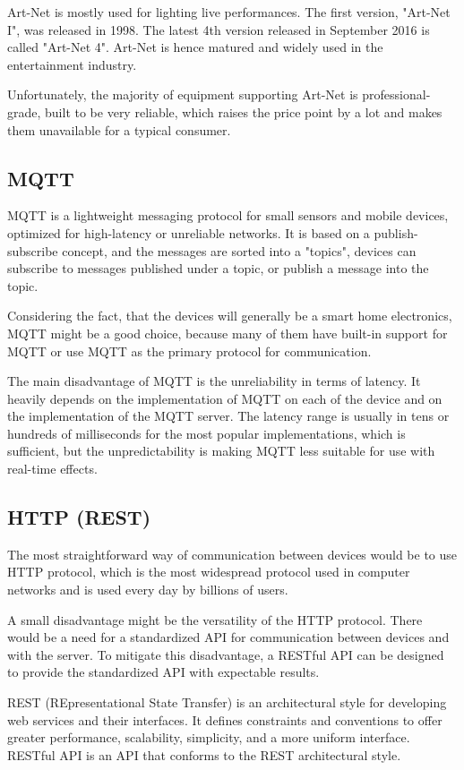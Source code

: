 Art-Net is mostly used for lighting live performances. The first version,
"Art-Net I", was released in 1998. The latest 4th version released
in September 2016
is called "Art-Net 4". Art-Net is hence matured and widely used in the
entertainment industry.


Unfortunately, the majority of equipment supporting Art-Net is
professional-grade, built to be very reliable, which raises the price point
by a lot and makes them unavailable for a typical consumer.


\hypertarget{x-mqtt}{\subsection{MQTT}}
MQTT is a lightweight messaging protocol for small sensors and mobile devices,
optimized for high-latency or unreliable networks.  It is
based on a publish-subscribe concept, and the messages are sorted into a "topics",
devices can subscribe to messages published under a topic, or publish
a message into the topic.\cite{mqtthp}


Considering the fact, that the devices will generally be a smart home
electronics, MQTT might be a good choice, because many of them have built-in
support for MQTT or use MQTT as the primary protocol for communication.


The main disadvantage of MQTT is the unreliability in terms of latency.
It heavily depends on the implementation of MQTT on each of the device and on
the implementation of the MQTT server. The latency range is usually
in tens or hundreds of milliseconds for the most popular implementations,
\cite{mqttlat} which is sufficient, but the unpredictability is making MQTT
less suitable for use with real-time effects.


\subsection{HTTP (REST)}
The most straightforward way of communication between devices would be to use
HTTP protocol, which is the most widespread protocol used in computer networks
and is used every day by billions of users. \cite{httpsrv}


A small disadvantage might be the versatility of the HTTP protocol. There would be
a need for a standardized API for communication between devices and with the
server. To mitigate this disadvantage, a RESTful API can be designed to provide
the standardized API with expectable results.


REST (REpresentational State Transfer) is an architectural style for developing
web services and their interfaces. It defines constraints and conventions to
offer greater performance, scalability, simplicity, and a more uniform interface.
\cite{restdef} RESTful API is an API that conforms to the REST architectural style.
